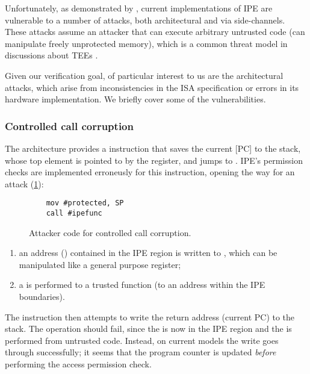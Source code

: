 Unfortunately, as demonstrated by \cite{Bognar2024}, current implementations of IPE are vulnerable to a number of attacks, both architectural and via side-channels. These attacks assume an attacker that can execute arbitrary untrusted code (\ie can manipulate freely unprotected memory), which is a common threat model in discussions about TEEs \todocite{}.

Given our verification goal, of particular interest to us are the architectural attacks, which arise from inconsistencies in the ISA specification or errors in its hardware implementation. We briefly cover some of the vulnerabilities.

\subsubsection{Controlled call corruption}
\label{sec:call-corruption}

The \msp architecture provides a  instruction that saves the current [PC] to the stack, whose top element is pointed to by the  register, and jumps to . IPE's permission checks are implemented erroneusly for this instruction, opening the way for an attack (\cref{fig:call-corruption}):

\begin{figure}
  \begin{verbatim}
    mov #protected, SP
    call #ipefunc
  \end{verbatim}%
  \caption{Attacker code for controlled call corruption.}
  \label{fig:call-corruption}
\end{figure}

\begin{enumerate}
\item an address () contained in the IPE region is written to , which can be manipulated like a general purpose register;
\item a  is performed to a trusted function (\ie to an address  within the IPE boundaries).
\end{enumerate}

The  instruction then attempts to write the return address (current PC) to the stack. The operation should fail, since the  is now in the IPE region and the  is performed from untrusted code. Instead, on current models the write goes through successfully; it seems that the program counter is updated \emph{before} performing the access permission check.

